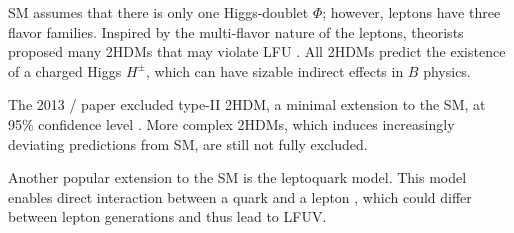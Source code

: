 SM assumes that there is only one Higgs-doublet $\Phi$; however, leptons have
three flavor families.
Inspired by the multi-flavor nature of the leptons, theorists proposed many
2HDMs that may violate LFU \cite{Branco:2011iw}.
All 2HDMs predict the existence of a charged Higgs $H^{\pm}$, which can have
sizable indirect effects in $B$ physics.

The 2013 \BaBar/ paper excluded type-II 2HDM, a minimal extension to the SM, at
95\% confidence level \cite{Lees:2013uzd}.
More complex 2HDMs, which induces increasingly deviating predictions from SM, are
still not fully excluded.

Another popular extension to the SM is the leptoquark model.
This model enables direct interaction between a quark and a
lepton \cite{Faber:2018afz}, which could differ between lepton generations and 
thus lead to LFUV.
